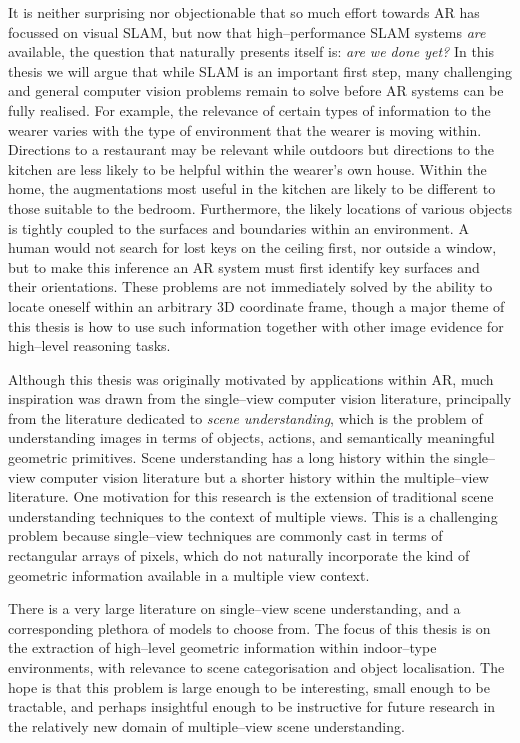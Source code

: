 It is neither surprising nor objectionable that so much effort towards
AR has focussed on visual SLAM, but now that high--performance SLAM
systems \textit{are} available, the question that naturally presents
itself is: \textit{are we done yet?} In this thesis we will argue that
while SLAM is an important first step, many challenging and general
computer vision problems remain to solve before AR systems can be
fully realised. For example, the relevance of certain types of
information to the wearer varies with the type of environment that the
wearer is moving within. Directions to a restaurant may be relevant
while outdoors but directions to the kitchen are less likely to be
helpful within the wearer's own house. Within the home, the
augmentations most useful in the kitchen are likely to be different to
those suitable to the bedroom. Furthermore, the likely locations of
various objects is tightly coupled to the surfaces and boundaries
within an environment. A human would not search for lost keys on the
ceiling first, nor outside a window, but to make this inference an AR
system must first identify key surfaces and their orientations. These
problems are not immediately solved by the ability to locate oneself
within an arbitrary 3D coordinate frame, though a major theme of this
thesis is how to use such information together with other image
evidence for high--level reasoning tasks.

Although this thesis was originally motivated by applications within
AR, much inspiration was drawn from the single--view computer vision
literature, principally from the literature dedicated to \textit{scene
  understanding}, which is the problem of understanding images in
terms of objects, actions, and semantically meaningful geometric
primitives. Scene understanding has a long history within the
single--view computer vision literature but a shorter history within
the multiple--view literature. One motivation for this
research is the extension of traditional scene understanding
techniques to the context of multiple views. This is a challenging
problem because single--view techniques are commonly cast in terms of
rectangular arrays of pixels, which do not naturally incorporate the
kind of geometric information available in a multiple view context.

There is a very large literature on single--view scene understanding, and a
corresponding plethora of models to choose from. The focus of this
thesis is on the extraction of high--level geometric information
within indoor--type environments, with relevance to scene
categorisation and object localisation. The hope is that this problem
is large enough to be interesting, small enough to be tractable, and
perhaps insightful enough to be instructive for future research in
the relatively new domain of multiple--view scene understanding.

